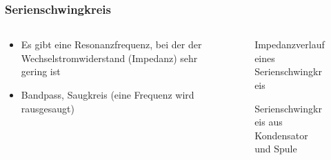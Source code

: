 \begin{frame}

\end{frame}

\begin{frame}
\frametitle{Serienschwingkreis}
\begin{columns}
    \begin{column}{0.48\textwidth}
    \begin{itemize}
  \item Es gibt eine Resonanzfrequenz, bei der der Wechselstromwiderstand (Impedanz) sehr gering ist
  \item Bandpass, Saugkreis (eine Frequenz wird rausgesaugt)
  \end{itemize}

    \end{column}
   \begin{column}{0.48\textwidth}
       
\begin{figure}
    \caption{\scriptsize Impedanzverlauf eines Serienschwingkreis}
    \label{e_serienschwingkreis_z}
\end{figure}


\begin{figure}
    \caption{\scriptsize Serienschwingkreis aus Kondensator und Spule}
    \label{e_serienschwingkreis_cl}
\end{figure}


   \end{column}
\end{columns}

\end{frame}%
